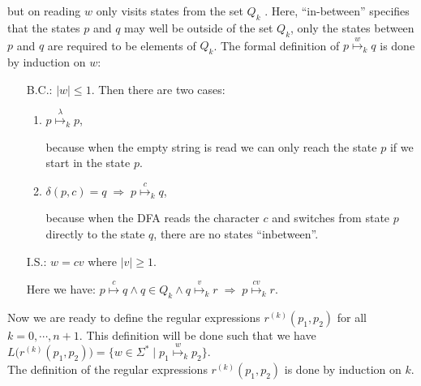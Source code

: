 but on reading $w$ only visits states from the set
$Q_k$ .  Here, ``in-between'' specifies that the states $p$ and $q$ may well be outside of the set
$Q_k$, only the states between $p$ and $q$ are required to be elements of $Q_k$.
The formal definition of $p \stackrel{w}{\mapsto}_k q$ is done by induction on  $w$:
\begin{enumerate}
\item[B.C.:] $|w| \leq 1$.  Then there are two cases:
  \begin{enumerate}
  \item $p \stackrel{\lambda}{\mapsto}_k p$,

        because when the empty string is read we can only reach the state $p$ if we start in the state $p$.
  \item $\delta(p, c) = q \;\Rightarrow\; p \stackrel{c}{\mapsto}_k q$,

        because when the \textsc{DFA} reads the character $c$ and switches from state $p$ directly
        to the state $q$, there are no states ``inbetween''.
  \end{enumerate}
\item[I.S.:] $w = cv$ where $|v| \geq 1$.

             Here we have:
             \hspace*{1.3cm}
            $p \stackrel{c}{\mapsto} q \wedge q \in Q_k \wedge q \stackrel{v}{\mapsto}_k r
              \;\Rightarrow\; p \stackrel{cv}{\mapsto}_k r$.
\end{enumerate}
Now we are ready to define the regular expressions $r^{(k)}(p_1, p_2)$ for all $k=0,\cdots,n+1$.
This definition will be done such that we have
\\[0.2cm]
\hspace*{1.3cm}
$L\bigl(r^{(k)}(p_1, p_2)\bigr) = \bigl\{ w \in \Sigma^* \mid p_1 \stackrel{w}{\mapsto}_k p_2 \bigr\}$.
\\[0.2cm]
The definition of the regular expressions $r^{(k)}(p_1, p_2)$ is done by induction on $k$.
